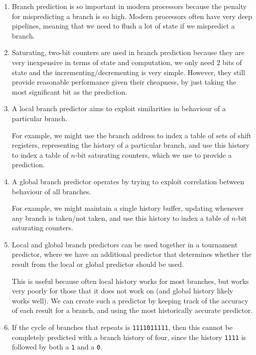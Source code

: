 


\begin{enumerate}[label=(\alph*)]

  \item
    Branch prediction is so important in modern processors because the penalty for mispredicting a branch is so high. Modern processors often have very deep pipelines, meaning that we need to flush a lot of state if we mispredict a branch.

  \item
    Saturating, two-bit counters are used in branch prediction because they are very inexpensive in terms of state and computation, we only need 2 bits of state and the incrementing/decrementing is very simple. However, they still provide reasonable performance given their cheapness, by just taking the most significant bit as the prediction.

  \item
    A local branch predictor aims to exploit similarities in behaviour of a particular branch.

    For example, we might use the branch address to index a table of sets of shift registers, representing the history of a particular branch, and use this history to index a table of $n$-bit saturating counters, which we use to provide a prediction.

  \item
    A global branch predictor operates by trying to exploit correlation between behaviour of all branches.

    For example, we might maintain a single history buffer, updating whenever any branch is taken/not taken, and use this history to index a table of $n$-bit saturating counters.

  \item
    Local and global branch predictors can be used together in a tournament predictor, where we have an additional predictor that determines whether the result from the local or global predictor should be used.

    This is useful because often local history works for most branches, but works very poorly for those that it does not work on (and global history likely works well). We can create such a predictor by keeping track of the accuracy of each result for a branch, and using the most historically accurate predictor.

  \item

    If the cycle of branches that repeats is \texttt{1111011111}, then this cannot be completely predicted with a branch history of four, since the history \texttt{1111} is followed by both a \texttt{1} and a \texttt{0}.


\end{enumerate}
